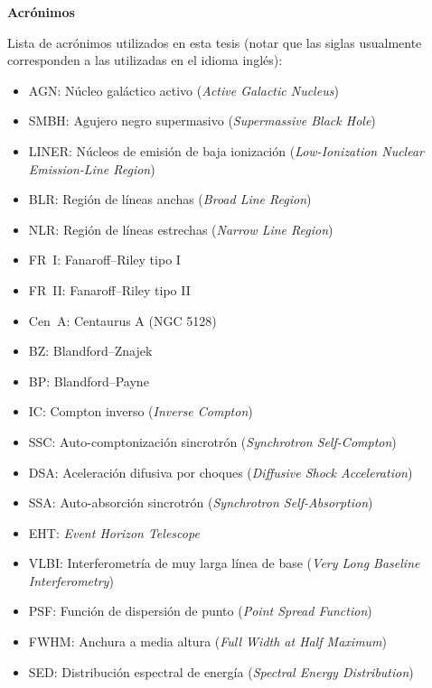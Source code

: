\begin{Large}\textbf{Acr\'onimos}\end{Large}

\bigskip

Lista de acr\'onimos utilizados en esta tesis (notar que las siglas usualmente corresponden a las utilizadas en el idioma ingl\'es):

\begin{itemize}

 \item AGN: Núcleo galáctico activo (\textit{Active Galactic Nucleus})
 \item SMBH: Agujero negro supermasivo (\textit{Supermassive Black Hole})
 \item LINER: Núcleos de emisión de baja ionización (\textit{Low-Ionization Nuclear Emission-Line Region})
 \item BLR: Región de líneas anchas (\textit{Broad Line Region})
 \item NLR: Región de líneas estrechas (\textit{Narrow Line Region})
 \item FR~I: Fanaroff–Riley tipo I
 \item FR~II: Fanaroff–Riley tipo II
 \item Cen~A: Centaurus A (NGC 5128)
 \item BZ: Blandford–Znajek
 \item BP: Blandford–Payne
 \item IC: Compton inverso (\textit{Inverse Compton})
 \item SSC: Auto-comptonizaci\'on sincrotr\'on (\textit{Synchrotron Self-Compton})
 \item DSA: Aceleración difusiva por choques (\textit{Diffusive Shock Acceleration})
 \item SSA: Auto-absorción sincrotrón (\textit{Synchrotron Self-Absorption})
 \item EHT: \textit{Event Horizon Telescope}
 \item VLBI: Interferometría de muy larga línea de base (\textit{Very Long Baseline Interferometry})
 \item PSF: Función de dispersión de punto (\textit{Point Spread Function})
 \item FWHM: Anchura a media altura (\textit{Full Width at Half Maximum})
 \item SED: Distribución espectral de energía (\textit{Spectral Energy Distribution})
 
\end{itemize}

 
 
 
 
 
 

